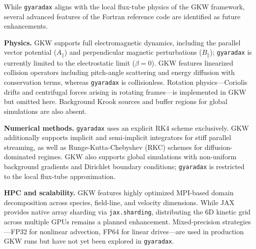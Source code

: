 \documentclass{article}
\theoremstyle{plain}
\theoremstyle{definition}
\theoremstyle{remark}
\begin{document}
While \texttt{gyaradax} aligns with the local flux-tube physics of the GKW framework, several advanced features of the Fortran reference code are identified as future enhancements.

\textbf{Physics.}
GKW supports full electromagnetic dynamics, including the parallel vector potential ($A_\parallel$) and perpendicular magnetic perturbations ($B_\parallel$); \texttt{gyaradax} is currently limited to the electrostatic limit ($\beta = 0$). GKW features linearized collision operators including pitch-angle scattering and energy diffusion with conservation terms, whereas \texttt{gyaradax} is collisionless. Rotation physics---Coriolis drifts and centrifugal forces arising in rotating frames---is implemented in GKW but omitted here. Background Krook sources and buffer regions for global simulations are also absent.

\textbf{Numerical methods.}
\texttt{gyaradax} uses an explicit RK4 scheme exclusively. GKW additionally supports implicit and semi-implicit integrators for stiff parallel streaming, as well as Runge-Kutta-Chebyshev (RKC) schemes for diffusion-dominated regimes. GKW also supports global simulations with non-uniform background gradients and Dirichlet boundary conditions; \texttt{gyaradax} is restricted to the local flux-tube approximation.

\textbf{HPC and scalability.}
GKW features highly optimized MPI-based domain decomposition across species, field-line, and velocity dimensions. While JAX provides native array sharding via \texttt{jax.sharding}, distributing the 6D kinetic grid across multiple GPUs remains a planned enhancement. Mixed-precision strategies---FP32 for nonlinear advection, FP64 for linear drives---are used in production GKW runs but have not yet been explored in \texttt{gyaradax}.


\newpage
\end{document}
